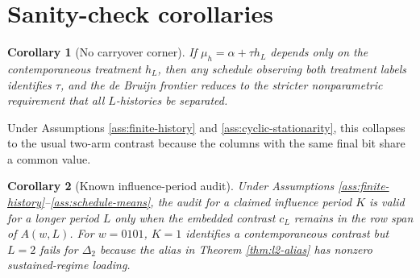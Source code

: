 \documentclass[11pt]{article}
\theoremstyle{definition}
\theoremstyle{plain}
\newtheorem{corollary}{Corollary}
\theoremstyle{remark}
\begin{document}
\section{Sanity-check corollaries}
\begin{corollary}[No carryover corner]\label{cor:no-carryover}
If \(\mu_h=\alpha+\tau h_L\) depends only on the contemporaneous treatment \(h_L\), then any schedule observing both treatment labels identifies \(\tau\), and the de Bruijn frontier reduces to the stricter nonparametric requirement that all \(L\)-histories be separated.
\end{corollary}
Under Assumptions \ref{ass:finite-history} and \ref{ass:cyclic-stationarity}, this collapses to the usual two-arm contrast because the columns with the same final bit share a common value.

\begin{corollary}[Known influence-period audit]\label{cor:known-L-audit}
Under Assumptions \ref{ass:finite-history}--\ref{ass:schedule-means}, the audit for a claimed influence period \(K\) is valid for a longer period \(L\) only when the embedded contrast \(c_L\) remains in the row span of \(A(w,L)\). For \(w=0101\), \(K=1\) identifies a contemporaneous contrast but \(L=2\) fails for \(\Delta_2\) because the alias in Theorem \ref{thm:l2-alias} has nonzero sustained-regime loading.
\end{corollary}
\end{document}
